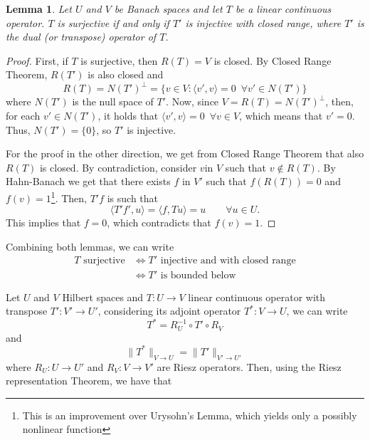 \documentclass{article}
\newtheorem{lemma}{Lemma}
\begin{document}
\begin{lemma}
    Let \(U\) and \(V\) be Banach spaces and let \(T\) be a linear continuous 
    operator. \(T\) is surjective if and only if \(T'\) is injective with closed 
    range, where \(T'\) is the dual (or transpose) operator of \(T\).
\end{lemma}
\begin{proof}
    First, if \(T\) is surjective, then \(R(T) = V\) is closed. By Closed Range 
    Theorem, \(R(T')\) is also closed and 
    \begin{displaymath}
        R(T) = N(T')^\bot = 
        \{v\in V: \langle v', v\rangle = 0 \,\,\, \forall v' \in N(T')\}
    \end{displaymath}
    where \(N(T')\) is the null space of \(T'\). Now, since 
    \(V = R(T) = N(T')^\bot\), then, for each \(v' \in N(T')\), it holds
    that \( \langle v', v\rangle = 0\,\,\, \forall v \in V\), which means that 
    \(v' = 0\). Thus, \(N(T') = \{0\}\), so \(T'\) is injective.

    For the proof in the other direction, we get from Closed Range Theorem that also $R(T)$ is closed. By contradiction, consider $v$in $V$ such that $v\not\in R(T)$. By Hahn-Banach we get that there exists $f$ in $V'$ such that $f(R(T)) = 0$ and $f(v)=1$\footnote{This is an improvement over Urysohn's Lemma, which yields only a possibly nonlinear function}. Then, $T'f$ is such that
        $$ \langle T'f', u\rangle = \langle f, Tu\rangle = u \qquad \forall u\in U.$$
    This implies that $f=0$, which contradicts that $f(v)=1$. 

\end{proof}

Combining both lemmas, we can write
\begin{align*}
    T \text{ surjective}
    &\Longleftrightarrow T'\text{ injective and with closed range}
    \\&\Longleftrightarrow T'\text{ is bounded below}
\end{align*}

Let \(U\) and \(V\) Hilbert spaces and \(T:U\to V\) linear continuous operator
with transpose \(T':V'\to U'\), considering its adjoint operator \(T^*:V \to U\), 
we can write \[T^* = R_U^{-1} \circ T' \circ R_V\] and 
\[\lVert T^* \rVert_{V\to U} = \lVert T' \rVert_{V'\to U'}\] 
where \(R_U: U\to U'\) and 
\(R_V: V\to V'\) are Riesz operators. Then, using the Riesz representation 
Theorem, we have that
\end{document}
